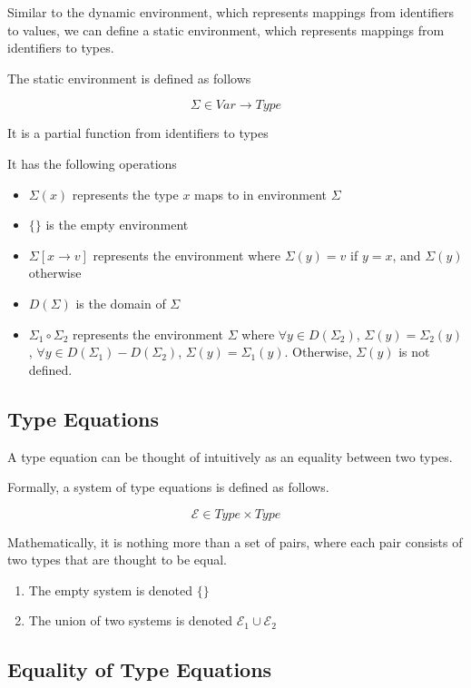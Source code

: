 \documentclass[titlepage]{article}
\begin{document}
Similar to the dynamic environment, which represents mappings from identifiers to values, we can define a static environment, which represents mappings from identifiers to types.

The static environment is defined as follows

$$\Sigma \in Var \rightarrow Type$$

It is a partial function from identifiers to types

It has the following operations

\begin{itemize}
  \item $\Sigma (x)$ represents the type $x$ maps to in environment $\Sigma$
  \item $\{\}$ is the empty environment
  \item $\Sigma [x \rightarrow v]$ represents the environment where $\Sigma (y) = v$ if $y = x$, and $\Sigma (y)$ otherwise
  \item $D(\Sigma)$ is the domain of $\Sigma$
  \item $\Sigma_1 \circ \Sigma_2$ represents the environment $\Sigma$ where $\forall y \in D(\Sigma_2)$, $\Sigma(y) = \Sigma_2(y)$, $\forall y \in D(\Sigma_1) - D(\Sigma_2)$, $\Sigma(y) = \Sigma_1(y)$. Otherwise, $\Sigma(y)$ is not defined.
  \end{itemize}

\subsection{Type Equations}

A type equation can be thought of intuitively as an equality between two types.

Formally, a system of type equations is defined as follows.

$$\mathcal{E} \in Type \times Type$$

Mathematically, it is nothing more than a set of pairs, where each pair consists of two types that are thought to be equal.

\begin{enumerate}
\item The empty system is denoted $\{\}$
\item The union of two systems is denoted $\mathcal{E}_1 \cup \mathcal{E}_2$

\end{enumerate}

\newpage

\subsection{Equality of Type Equations}
\end{document}
